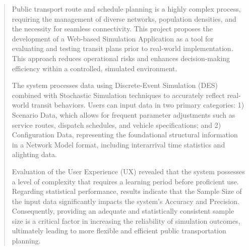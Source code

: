 \begin{abstract}
\begin{mypara}
    \indent Public transport route and schedule planning is a highly complex process, requiring the management of diverse networks, population densities, and the necessity for seamless connectivity. This project proposes the development of a Web-based Simulation Application as a tool for evaluating and testing transit plans prior to real-world implementation. This approach reduces operational risks and enhances decision-making efficiency within a controlled, simulated environment.
\end{mypara}
\begin{mypara}
    \indent The system processes data using Discrete-Event Simulation (DES) combined with Stochastic Simulation techniques to accurately reflect real-world transit behaviors. Users can input data in two primary categories: 1) Scenario Data, which allows for frequent parameter adjustments such as service routes, dispatch schedules, and vehicle specifications; and 2) Configuration Data, representing the foundational structural information in a Network Model format, including interarrival time statistics and alighting data.
\end{mypara}
\begin{mypara}
    \indent Evaluation of the User Experience (UX) revealed that the system possesses a level of complexity that requires a learning period before proficient use. Regarding statistical performance, results indicate that the Sample Size of the input data significantly impacts the system’s Accuracy and Precision. Consequently, providing an adequate and statistically consistent sample size is a critical factor in increasing the reliability of simulation outcomes, ultimately leading to more flexible and efficient public transportation planning.
\end{mypara}
\end{abstract}

%

